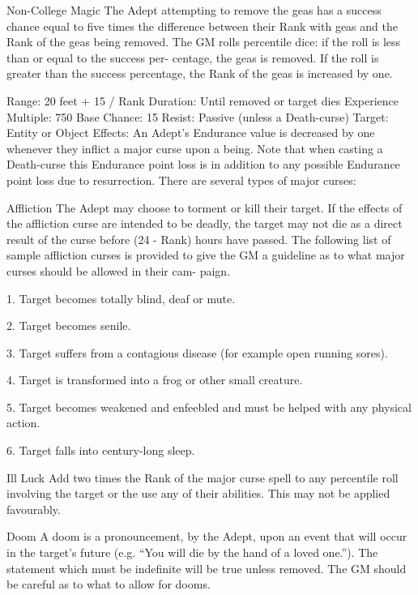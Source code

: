 \begin{Chapter}{Non-College Magic}
The  Adept  attempting  to  remove  the  geas  has  a 
success  chance  equal  to  five  times  the  difference 
between their Rank with geas and the Rank of the 
geas being removed. The GM rolls percentile dice: 
if  the  roll  is  less  than  or  equal  to  the  success  per-
centage,  the  geas  is  removed.  If  the  roll  is  greater 
than the success percentage, the Rank of the geas is 
increased by one. 

Range: 20 feet + 15 / Rank 
Duration: Until removed or target dies 
Experience Multiple: 750 
Base Chance: 15%
Resist: Passive (unless a Death-curse) 
Target: Entity or Object 
Effects:  An  Adept’s  Endurance  value  is  decreased 
by one whenever they inflict a major curse upon a 
being.  Note  that  when  casting  a  Death-curse  this 
Endurance point loss is in addition to any possible 
Endurance point loss due to resurrection. There are 
several types of major curses: 

Affliction The Adept may choose to torment or kill 
their target. If the effects of the affliction curse are 
intended  to  be  deadly,  the  target  may  not  die  as  a 
direct  result  of  the  curse  before  (24  -  Rank)  hours 
have passed. The following list of sample affliction 
curses is provided to give the GM a guideline as to 
what major curses should be allowed in their cam-
paign. 

1. Target becomes totally blind, deaf or mute. 

2. Target becomes senile. 

3.  Target  suffers  from  a  contagious  disease  (for 
example open running sores). 

4.  Target  is  transformed  into a  frog  or  other  small 
creature. 

5.  Target  becomes  weakened  and  enfeebled  and 
must be helped with any physical action. 

6. Target falls into century-long sleep. 

Ill  Luck  Add  two  times  the  Rank  of  the  major 
curse  spell  to  any  percentile  roll  involving  the 
target or the use any of their abilities. This may not 
be applied favourably. 

Doom A doom is a pronouncement, by the Adept, 
upon an event that will occur in the target’s  future 
(e.g.  “You  will  die  by  the  hand  of  a  loved  one.”). 
The statement which must be indefinite will be true 
unless  removed.  The  GM  should  be  careful  as  to 
what to allow for dooms. 


\end{Chapter}
